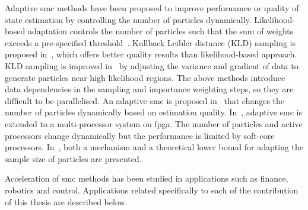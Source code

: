 Adaptive \gls{smc} methods have been proposed to improve performance or quality of state estimation by controlling the number of particles dynamically. 
Likelihood-based adaptation controls the number of particles such that the sum of weights exceeds a pre-specified threshold~\cite{koller98}.
Kullback Leibler distance (KLD) sampling is proposed in~\cite{fox03}, which offers better quality results than likelihood-based approach. 
KLD sampling is improved in~\cite{park10} by adjusting the variance and gradient of data to generate particles near high likelihood regions. 
The above methods introduce data dependencies in the sampling and importance weighting steps, so they are difficult to be parallelised. 
An adaptive \gls{smc} is proposed in~\cite{bolic02} that changes the number of particles dynamically based on estimation quality. 
In~\cite{chau12fpl}, adaptive \gls{smc} is extended to a multi-processor system on \gls{fpga}.
The number of particles and active processors change dynamically but the performance is limited by soft-core processors.
In~\cite{liu07}, both a mechanism and a theoretical lower bound for adapting the sample size of particles are presented.

Acceleration of \gls{smc} methods has been studied in applications such as finance, robotics and control.
Applications related specifically to each of the contribution of this thesis are described below.




